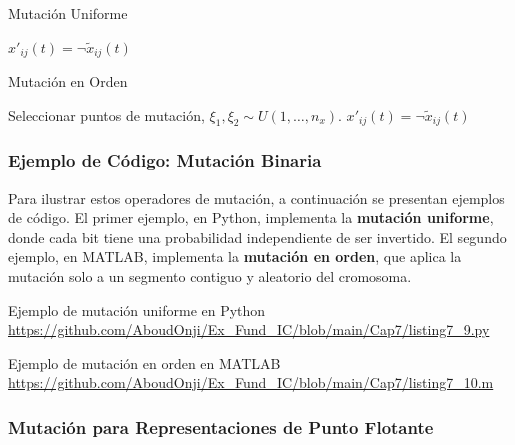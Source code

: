 \documentclass[aspectratio=169,xcolor=dvipsnames]{beamer}
\begin{document}

\begin{frame}{Mutación Uniforme}
   \begin{algorithm}[H]
\caption{Mutación Uniforme/Aleatoria}
\label{alg:uniform_mutation}
\begin{algorithmic}[1]
        \State $x'_{ij}(t) = \neg \tilde{x}_{ij}(t)$ 
    \EndIf
\EndFor
\end{algorithmic}
\end{algorithm} 
\end{frame}

\begin{frame}{Mutación en Orden}
\begin{algorithm}[H]
\caption{Mutación en Orden}
\begin{algorithmic}[1]
   \State Seleccionar puntos de mutación, $\xi_1, \xi_2 \sim U(1, \dots, n_x)$.
        \State $x'_{ij}(t) = \neg \tilde{x}_{ij}(t)$
    \EndIf
\EndFor
\end{algorithmic}
\end{algorithm}
\end{frame}
\begin{frame}[fragile]
    \frametitle{Ejemplo de Código: Mutación Binaria}
   Para ilustrar estos operadores de mutación, a continuación se presentan ejemplos de código. El primer ejemplo, en Python, implementa la \textbf{mutación uniforme}, donde cada bit tiene una probabilidad independiente de ser invertido. El segundo ejemplo, en MATLAB, implementa la \textbf{mutación en orden}, que aplica la mutación solo a un segmento contiguo y aleatorio del cromosoma.

 \begin{block}{Ejemplo de mutación uniforme en Python}
        \url{https://github.com/AboudOnji/Ex_Fund_IC/blob/main/Cap7/listing7_9.py}
    \end{block}
    \begin{block}{Ejemplo de mutación en orden en MATLAB}
        \url{https://github.com/AboudOnji/Ex_Fund_IC/blob/main/Cap7/listing7_10.m}
    \end{block}
   
\end{frame}

\subsubsection{Mutación para Representaciones de Punto Flotante}
\end{document}
